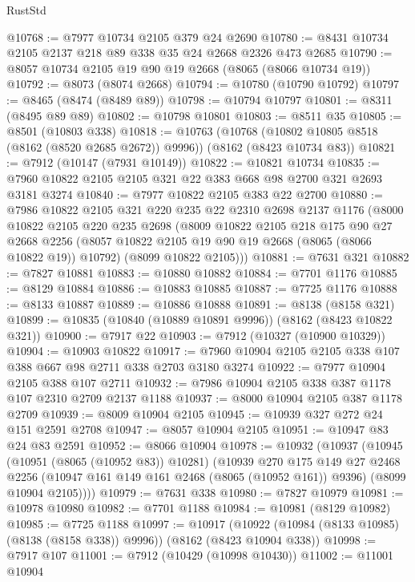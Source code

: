 \begin{lexlean}{RustStd}
\begin{coremodule}
@10768 := @7977 @10734 @2105 @379 @24 @2690
@10780 := @8431 @10734 @2105 @2137 @218 @89 @338 @35 @24 @2668 @2326 @473 @2685
@10790 := @8057 @10734 @2105 @19 @90 @19 @2668 (@8065 (@8066 @10734 @19))
@10792 := @8073 (@8074 @2668)
@10794 := @10780 (@10790 @10792)
@10797 := @8465 (@8474 (@8489 @89))
@10798 := @10794 @10797
@10801 := @8311 (@8495 @89 @89)
@10802 := @10798 @10801
@10803 := @8511 @35
@10805 := @8501 (@10803 @338)
@10818 := @10763
    (@10768 (@10802 @10805 @8518 (@8162 (@8520 @2685 @2672)) @9996))
    (@8162 (@8423 @10734 @83))
@10821 := @7912 (@10147 (@7931 @10149))
@10822 := @10821 @10734
@10835 := @7960 @10822 @2105 @2105 @321 @22 @383 @668 @98 @2700 @321 @2693 @3181 @3274
@10840 := @7977 @10822 @2105 @383 @22 @2700
@10880 := @7986
    @10822
    @2105
    @321
    @220
    @235
    @22
    @2310
    @2698
    @2137
    @1176
    (@8000
      @10822
      @2105
      @220
      @235
      @2698
      (@8009
        @10822
        @2105
        @218
        @175
        @90
        @27
        @2668
        @2256
        (@8057 @10822 @2105 @19 @90 @19 @2668 (@8065 (@8066 @10822 @19)) @10792)
        (@8099 @10822 @2105)))
@10881 := @7631 @321
@10882 := @7827 @10881
@10883 := @10880 @10882
@10884 := @7701 @1176
@10885 := @8129 @10884
@10886 := @10883 @10885
@10887 := @7725 @1176
@10888 := @8133 @10887
@10889 := @10886 @10888
@10891 := @8138 (@8158 @321)
@10899 := @10835 (@10840 (@10889 @10891 @9996)) (@8162 (@8423 @10822 @321))
@10900 := @7917 @22
@10903 := @7912 (@10327 (@10900 @10329))
@10904 := @10903 @10822
@10917 := @7960 @10904 @2105 @2105 @338 @107 @388 @667 @98 @2711 @338 @2703 @3180 @3274
@10922 := @7977 @10904 @2105 @388 @107 @2711
@10932 := @7986 @10904 @2105 @338 @387 @1178 @107 @2310 @2709 @2137 @1188
@10937 := @8000 @10904 @2105 @387 @1178 @2709
@10939 := @8009 @10904 @2105
@10945 := @10939 @327 @272 @24 @151 @2591 @2708
@10947 := @8057 @10904 @2105
@10951 := @10947 @83 @24 @83 @2591
@10952 := @8066 @10904
@10978 := @10932
    (@10937
      (@10945
        (@10951 (@8065 (@10952 @83)) @10281)
        (@10939
          @270
          @175
          @149
          @27
          @2468
          @2256
          (@10947 @161 @149 @161 @2468 (@8065 (@10952 @161)) @9396)
          (@8099 @10904 @2105))))
@10979 := @7631 @338
@10980 := @7827 @10979
@10981 := @10978 @10980
@10982 := @7701 @1188
@10984 := @10981 (@8129 @10982)
@10985 := @7725 @1188
@10997 := @10917
    (@10922 (@10984 (@8133 @10985) (@8138 (@8158 @338)) @9996))
    (@8162 (@8423 @10904 @338))
@10998 := @7917 @107
@11001 := @7912 (@10429 (@10998 @10430))
@11002 := @11001 @10904

\end{coremodule}
\end{lexlean}
